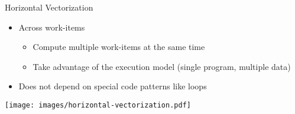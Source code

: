 
\begin{frame}{Horizontal Vectorization}

\begin{itemize}
    \item Across work-items
    \begin{itemize}
        \item Compute multiple work-items at the same time
        \item Take advantage of the execution model (single program, multiple data)
    \end{itemize}
    \item Does not depend on special code patterns like loops
\end{itemize}

\vspace{2ex}
\hspace{1em}\texttt{[image: images/horizontal-vectorization.pdf]}

\end{frame}



